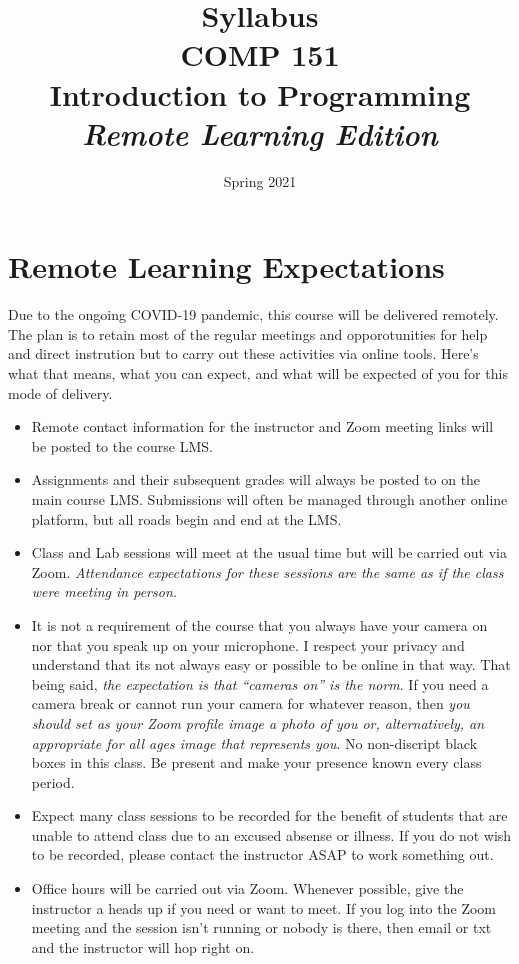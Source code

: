 \documentclass[10pt]{article}
\title{Syllabus \\ COMP 151 \\ Introduction to Programming \\ \textit{Remote Learning Edition}}
\author{  }
\date{Spring 2021}
\begin{document}
\maketitle

\section{Remote Learning Expectations}

Due to the ongoing COVID-19 pandemic, this course will be delivered remotely. The plan
is to retain most of the regular meetings and opporotunities for help and direct instrution
but to carry out these activities via online tools. Here's what that means, what you can expect,
and what will be expected of you for this mode of delivery.

\begin{itemize}
  \item Remote contact information for the instructor and Zoom meeting links will be posted to the
  course LMS.

  \item Assignments and their subsequent grades will always be posted to on the main course LMS. Submissions will often be managed through another online platform, but all roads begin and end at the LMS.

  \item Class and Lab sessions will meet at the usual time but will be carried out
  via Zoom. \textit{Attendance expectations for these sessions are the same as
  if the class were meeting in person.}

  \item It is not a requirement of the course that you always have your camera on nor
  that you speak up on your microphone. I respect your privacy and understand that its not
  always easy or possible to be online in that way. That being said, \textit{the expectation
  is that ``cameras on'' is the norm}. If you need a camera break or cannot run your camera for
  whatever reason, then \textit{you should set as your Zoom profile image a photo of you or,
  alternatively, an appropriate for all ages image that represents you}. No non-discript black
  boxes in this class. Be present and make your presence known every class period.

  \item Expect many class sessions to be recorded for the benefit of students that
  are unable to attend class due to an excused absense or illness. If you do not wish
  to be recorded, please contact the instructor ASAP to work something out.

  \item Office hours will be carried out via Zoom. Whenever possible, give the
  instructor a heads up if you need or want to meet. If you log into the Zoom meeting
  and the session isn't running or nobody is there, then email or txt and the instructor
  will hop right on.

\end{itemize}
\end{document}
